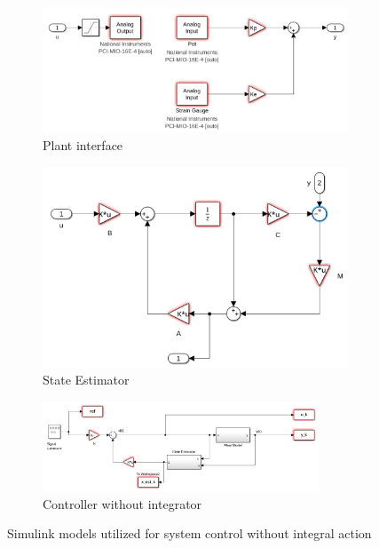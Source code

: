 \begin{figure}[H]
    \centering
    \begin{subfigure}{0.47\textwidth}
        \includegraphics[width=\textwidth]{Figs/Simulink Models/Plant Interface.png}
        \caption{Plant interface}
        \label{fig:plant_interface}
    \end{subfigure}
    \hfill
    \begin{subfigure}{0.37\textwidth}
        \includegraphics[width=\textwidth]{Figs/Simulink Models/State_Estimator.png}
        \caption{State Estimator}
        \label{fig:state_estimator}
    \end{subfigure}
    \begin{subfigure}{0.95\textwidth}
        \includegraphics[width=0.9\textwidth]{Figs/Simulink Models/Controller_without_integrator.png}
        \caption{Controller without integrator}
        \label{fig:controller_without_integrator}
    \end{subfigure}
    \caption{Simulink models utilized for system control without integral action}
    \label{fig:simulink_models_no_integrator}
\end{figure}


